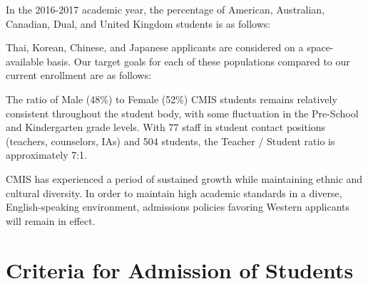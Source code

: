 In the 2016-2017 academic year, the percentage of American, Australian, Canadian, Dual, and United Kingdom students is as follows:


Thai, Korean, Chinese, and Japanese applicants are considered on a space-available basis.  Our target goals for each of these populations compared to our current enrollment are as follows:




The ratio of Male (48\%) to Female (52\%) CMIS students remains relatively consistent throughout the student body, with some fluctuation in the Pre-School and Kindergarten grade levels.   With 77 staff in student contact positions (teachers, counselors, IAs) and 504 students, the Teacher / Student ratio is approximately 7:1.  



CMIS has experienced a period of sustained growth while maintaining ethnic and cultural diversity.  In order to maintain high academic standards in a diverse, English-speaking environment, admissions policies favoring Western applicants will remain in effect.  

\section{Criteria for Admission of Students}

